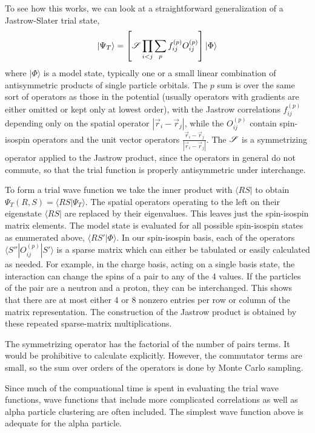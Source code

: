  To see how this works, we can look at a straightforward generalization
 of a Jastrow-Slater trial state,
 \begin{equation}
 |\Psi_T\rangle = \left [ {\cal S} \prod_{i<j} \sum_p
 f^{(p)}_{ij} O^{(p)}_{ij} \right ] |\Phi\rangle
 \end{equation}
 where $|\Phi\rangle$ is a model state, typically one or
 a small linear combination of antisymmetric
 products of single particle orbitals. The $p$ sum is over the
 same sort of operators as those in the potential (usually operators
 with gradients are either omitted or kept only at lowest order), with
 the Jastrow correlations $f^{(p)}_{ij}$ depending only on the spatial
 operator $|\vec r_i - \vec r_j|$, while the $O^{(p)}_{ij}$ contain
 spin-isospin operators and the unit vector operators
 $\frac{\vec r_i - \vec r_j}{ |\vec r_i - \vec r_j|}$. The ${\cal S}$
 is a symmetrizing operator applied to the Jastrow product, since
 the operators in general do not commute, so that the trial function
 is properly antisymmetric under interchange.
 
 To form a trial wave
 function we take the inner product with $\langle R S|$ to obtain
 $\Psi_T(R,S) = \langle R S|\Psi_T\rangle$. The spatial operators
 operating to the left on their eigenstate $\langle R S|$ are replaced
 by their eigenvalues. This leaves just the spin-isospin matrix elements.
 The model state is evaluated for all possible spin-isospin states as
 enumerated above, $\langle R S'|\Phi\rangle$. In our spin-isospin
 basis, each of
 the operators $\langle S''| O^{(p)}_{ij}|S'\rangle$ is a sparse matrix which
 can either be tabulated or easily calculated as needed. For example,
 in the charge basis, acting on a single basis state, the interaction
 can change the spins of a pair to any of the 4 values. If the particles
 of the pair are a neutron and a proton, they can be interchanged. This
 shows that there are at most either 4 or 8 nonzero entries per row or
 column of the matrix representation. The construction of the Jastrow
 product is obtained by these repeated sparse-matrix multiplications.
 
 The symmetrizing operator has the factorial of the number of pairs
 terms. It would be prohibitive to calculate explicitly. However, the
 commutator terms are small, so the sum over orders of the operators
 is done by Monte Carlo sampling.
 
 Since much of the compuational time is spent in evaluating the trial
 wave functions, wave functions that include more complicated correlations
 as well as alpha particle clustering are often included. The simplest
 wave function above is adequate for the alpha particle.
 
